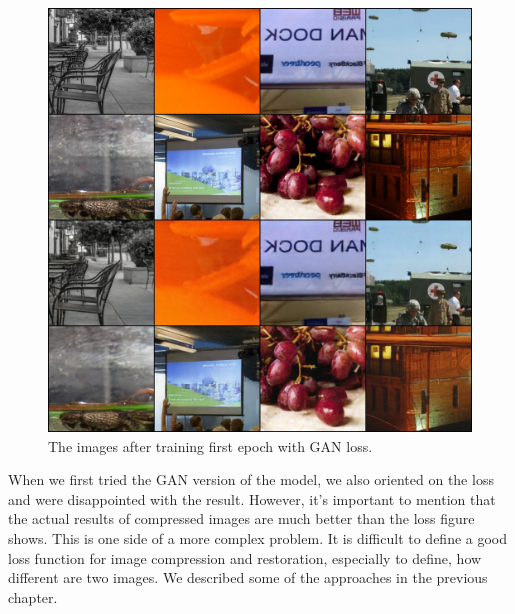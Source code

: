 \begin{figure}
    \centering
    \includegraphics[width=\textwidth]{figure/gan_1000.jpg}
    \caption{The images after training first epoch with GAN loss.}
    \label{gan-first-epoch}
\end{figure}

When we first tried the GAN version of the model, we also oriented on the loss and were disappointed with the result. However, it's important to mention that the actual results of compressed images are much better than the loss figure shows. This is one side of a more complex problem. It is difficult to define a good loss function for image compression and restoration, especially to define, how different are two images. We described some of the approaches in the previous chapter.

